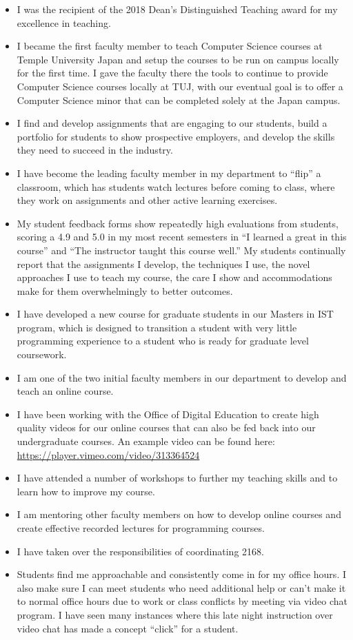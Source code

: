 \documentclass[10pt]{article}
\begin{document}
\begin{itemize}
	\item I was the recipient of the 2018 Dean’s Distinguished Teaching award for my excellence in teaching.
	\item I became the first faculty member to teach Computer Science courses at Temple University Japan and setup the courses to be run on campus locally for the first  time.  I gave the faculty there the tools to continue to provide Computer Science courses locally at TUJ, with our eventual goal is to offer a Computer Science minor that can be completed solely at the Japan campus.
	
	\item I find and develop assignments that are engaging to our students, build a portfolio for students to show prospective employers, and develop the skills they need to succeed in the industry.
	
	\item I have become the leading faculty member in my department to ``flip'' a classroom, which has students watch lectures before coming to class, where they work on assignments and other active learning exercises.
	\item My student feedback forms show repeatedly high evaluations from students, scoring a 4.9 and 5.0 in my most recent semesters in ``I learned a great in this course'' and ``The instructor taught this course well.''  My students continually report that the assignments I develop, the techniques I use, the novel approaches I use to teach my course, the care I show and  accommodations make for them overwhelmingly to better outcomes. 

	 
	\item I have  developed a new course for graduate students in our Masters in IST program, which is designed to transition a student with very little programming experience to a student who is ready for graduate level coursework.
	\item I am one of the two initial faculty members in our department to develop and teach an online course.
	\item I have been working with the Office of Digital Education to create high quality videos for our online courses that can also be fed back into our undergraduate courses.  An example video can be found here: \url{https://player.vimeo.com/video/313364524}
	\item I have attended a number of workshops to further my teaching skills and to learn how to improve my course.
	\item I am mentoring other faculty members on how to develop online courses and create effective recorded lectures for programming courses.
	\item I have taken over the responsibilities of coordinating 2168.
	\item Students find me approachable and consistently come in for my office hours.  I also make sure I can meet students who need additional help or can't make it to normal office hours due to work or class conflicts by  meeting via video chat program.   I have seen many instances where this late night instruction over video chat has made a concept ``click'' for a student.
\end{itemize}
\end{document}
